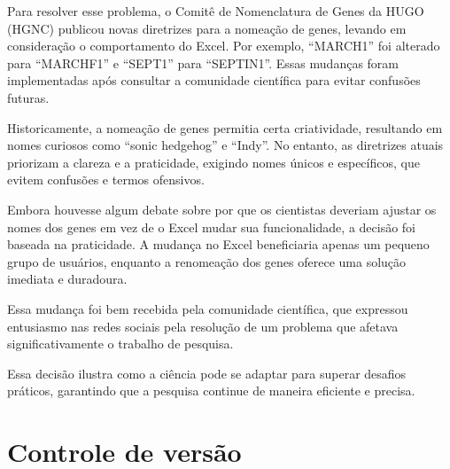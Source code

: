 \documentclass[
  a4paper,
]{book}
\begin{document}
\begin{tcolorbox}
Para resolver esse problema, o Comitê de Nomenclatura de Genes da HUGO
(HGNC) publicou novas diretrizes para a nomeação de genes, levando em
consideração o comportamento do Excel. Por exemplo, ``MARCH1'' foi
alterado para ``MARCHF1'' e ``SEPT1'' para ``SEPTIN1''. Essas mudanças
foram implementadas após consultar a comunidade científica para evitar
confusões futuras.\vspace{0.5em}

Historicamente, a nomeação de genes permitia certa criatividade,
resultando em nomes curiosos como ``sonic hedgehog'' e ``Indy''. No
entanto, as diretrizes atuais priorizam a clareza e a praticidade,
exigindo nomes únicos e específicos, que evitem confusões e termos
ofensivos.\vspace{0.5em}

Embora houvesse algum debate sobre por que os cientistas deveriam
ajustar os nomes dos genes em vez de o Excel mudar sua funcionalidade, a
decisão foi baseada na praticidade. A mudança no Excel beneficiaria
apenas um pequeno grupo de usuários, enquanto a renomeação dos genes
oferece uma solução imediata e duradoura.\vspace{0.5em}

Essa mudança foi bem recebida pela comunidade científica, que expressou
entusiasmo nas redes sociais pela resolução de um problema que afetava
significativamente o trabalho de pesquisa.\vspace{0.5em}

Essa decisão ilustra como a ciência pode se adaptar para superar
desafios práticos, garantindo que a pesquisa continue de maneira
eficiente e precisa.\vspace{0.5em}

\end{tcolorbox}


\chapter{Controle de versão}\label{sec-git}
\end{document}
